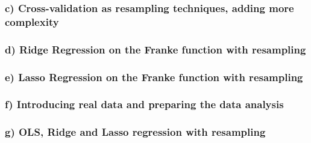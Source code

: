 \documentclass[a4paper, UKenglish]{article}
\newcommand{\0}{\mathbf{0}}
\newcommand{\1}{\mathbf{1}}
\begin{document}
\subsubsection{c) Cross-validation as resampling techniques, adding more complexity}

\newpage
\subsubsection{d) Ridge Regression on the Franke function with resampling}

\newpage
\subsubsection{e) Lasso Regression on the Franke function with resampling}

\newpage
\subsubsection{f) Introducing real data and preparing the data analysis}

\newpage
\subsubsection{g) OLS, Ridge and Lasso regression with resampling}

\end{document}
